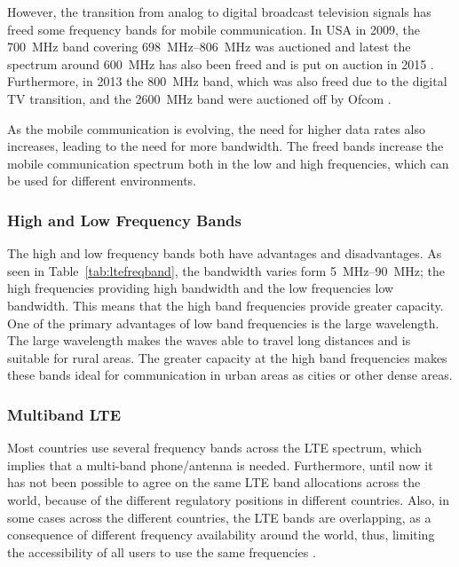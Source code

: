 However, the transition from analog to digital broadcast television signals has freed some frequency bands for mobile communication. In USA in 2009, the \SI{700}{MHz} band covering \SIrange{698}{806}{MHz} \cite{fcc2007auction} was auctioned and latest the spectrum around \SI{600}{MHz} has also been freed and is put on auction in 2015 \cite{Samantha2015tunableAntennas}. Furthermore, in 2013 the \SI{800}{MHz} band, which was also freed due to the digital TV transition, and the \SI{2600}{MHz} band were auctioned off by Ofcom \cite{james2014lte}.   

As the mobile communication is evolving, the need for higher data rates also increases, leading to the need for more bandwidth. The freed bands increase the mobile communication spectrum both in the low and high frequencies, which can be used for different environments.  

\subsubsection{High and Low Frequency Bands}
The high and low frequency bands both have advantages and disadvantages. As seen in Table~\ref{tab:ltefreqband}, the bandwidth varies form \SIrange{5}{90}{MHz}; the high frequencies providing high bandwidth and the low frequencies low bandwidth. This means that the high band frequencies provide greater capacity. One of the primary advantages of low band frequencies is the large wavelength. The large wavelength makes the waves able to travel long distances and is suitable for rural areas. The greater capacity at the high band frequencies makes these bands ideal for communication in urban areas as cities or other dense areas.

\subsubsection{Multiband LTE}
Most countries use several frequency bands across the LTE spectrum, which implies that a multi-band phone/antenna is needed.  
Furthermore, until now it has not been possible to agree on the same LTE band allocations across the world, because of the different regulatory positions in different countries. Also, in some cases across the different countries, the LTE bands are overlapping, as a consequence of different frequency availability around the world, thus, limiting the accessibility of all users to use the same frequencies \cite{radio2015electronics}.  

